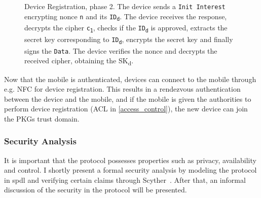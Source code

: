 \begin{figure}[ht]
  \caption[Device Registration, phase 2]{Device Registration, phase 2. 
  The device sends a \texttt{Init Interest} encrypting nonce \texttt{n} and its \texttt{ID\textsubscript{d}}.
  The device receives the response, decrypts the cipher \texttt{c\textsubscript{1}}, checks if the \texttt{ID\textsubscript{d}} is approved, extracts the secret key corresponding to \texttt{ID\textsubscript{d}}, encrypts the secret key and finally signs the \texttt{Data}.
  The device verifies the nonce and decrypts the received cipher, obtaining the SK\textsubscript{d}.
  }
  \label{fig:init_ibe_2}
\end{figure}



Now that the mobile is authenticated, devices can connect to the mobile through e.g. \gls{NFC} for device registration.
This results in a rendezvous authentication between the device and the mobile, and if the mobile is given the authorities to perform device registration (\gls{ACL} in \autoref{access_control}), the new device can join the \gls{PKG}s trust domain.

\subsubsection{Security Analysis}
It is important that the protocol possesses properties such as privacy, availability and control. 
I shortly present a formal security analysis by modeling the protocol in \gls{spdl} and verifying certain claims through Scyther~\cite{DBLP:conf/cav/Cremers08}.
After that, an informal discussion of the security in the protocol will be presented.


